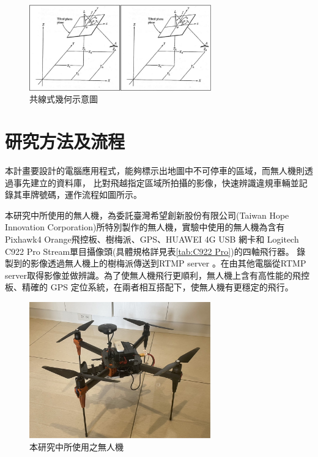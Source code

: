 \documentclass[12pt]{article}       %
\renewcommand{\figurename}{圖}                           %
\begin{document}
\begin{figure}[htbp]
    \centering
    \renewcommand{\figurename}{圖}                              %
    \includegraphics[width=0.7\textwidth]{ce.jpg}         %
    \caption{共線式幾何示意圖\cite{tsao2018}}           %
    \label{fig:ce}                                        %
\end{figure}

\section{\centering 研究方法及流程}
\hspace{2em}本計畫要設計的電腦應用程式，能夠標示出地圖中不可停車的區域，而無人機則透過事先建立的資料庫，
比對飛越指定區域所拍攝的影像，快速辨識違規車輛並記錄其車牌號碼，運作流程如圖所示。

本研究中所使用的無人機，為委託臺灣希望創新股份有限公司(Taiwan Hope Innovation Corporation)所特別製作的無人機，實驗中使用的無人機為含有 Pixhawk4 Orange飛控板、樹梅派、GPS、HUAWEI 4G USB 網卡和 Logitech C922 Pro Stream單目攝像頭(具體規格詳見表\ref{tab:C922 Pro})的四軸飛行器。
錄製到的影像透過無人機上的樹梅派傳送到RTMP server \cite{chen2011}\cite{mark2018}。在由其他電腦從RTMP server取得影像並做辨識。為了使無人機飛行更順利，無人機上含有高性能的飛控板、精確的 GPS 定位系統，在兩者相互搭配下，使無人機有更穩定的飛行。

\begin{figure}[h]
    \centering
    \includegraphics[width=0.7\textwidth]{UAVphoto.jpg}     %
    \caption{本研究中所使用之無人機}    %
    \label{fig:UAVphoto}    %
\end{figure}
\end{document}
